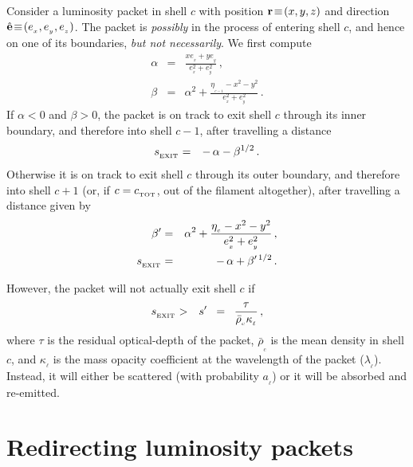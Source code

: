 \documentclass[usenatbib]{mn2e}
\numberwithin{equation}{section}
\begin{document}
Consider a luminosity packet in shell $c$ with position ${\bf r}\!\equiv\!(x,y,z)$ and direction $\hat{\bf e}\!\equiv\!(e_{_x},e_{_y},e_{_z})$. The packet is {\it possibly} in the process of entering shell $c$, and hence on one of its boundaries, {\it but not necessarily}. We first compute 
\begin{eqnarray}
\alpha&=&\frac{xe_{_x}+ye_{_y}}{e_{_x}^2+e_{_y}^2}\,,\\
\beta&=&\alpha^2+\frac{\eta_{_{c-1}}-x^2-y^2}{e_{_x}^2+e_{_y}^2}\,.
\end{eqnarray}
If $\alpha<0$ and $\beta>0$, the packet is on track to exit shell $c$ through its inner boundary, and therefore into shell $c-1$, after travelling a distance 
\begin{eqnarray}
s_{_{\rm EXIT}}&=&-\,\alpha-\beta^{1/2}\,.
\end{eqnarray}
Otherwise it is on track to exit shell $c$ through its outer boundary, and therefore into shell $c+1$ (or, if $c=c_{_{\rm TOT}}$, out of the filament altogether), after travelling a distance given by
\begin{eqnarray}
\beta'&=&\alpha^2+\frac{\eta_{_c}-x^2-y^2}{e_{_x}^2+e_{_y}^2}\,,\\
s_{_{\rm EXIT}}&=&-\,\alpha+\beta'^{\,1/2}\,.
\end{eqnarray}

However, the packet will not actually exit shell $c$ if 
\begin{eqnarray}
s_{_{\rm EXIT}}&>&s'\;\;=\;\;\frac{\tau}{{\bar\rho}_{_c}\kappa_{_\ell}}\,,
\end{eqnarray}
where $\tau$ is the residual optical-depth of the packet, ${\bar\rho}_{_c}$ is the mean density in shell $c$, and $\kappa_{_\ell}$ is the mass opacity coefficient at the wavelength of the packet ($\lambda_{_\ell}$). Instead, it will either be scattered (with probability $a_{_\ell}$) or it will be absorbed and re-emitted. 

\vspace{0.4cm}




\section{Redirecting luminosity packets}
\end{document}
